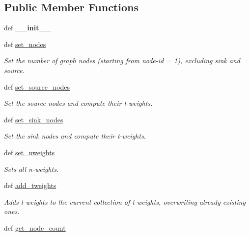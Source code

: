 \subsection*{Public Member Functions}
\begin{DoxyCompactItemize}
\item 
\hypertarget{classmedpy_1_1graphcut_1_1graph_1_1Graph_ada7c2ff7b950159feab5a4d2f69464c9}{
def {\bfseries \_\-\_\-init\_\-\_\-}}
\label{classmedpy_1_1graphcut_1_1graph_1_1Graph_ada7c2ff7b950159feab5a4d2f69464c9}

\item 
def \hyperlink{classmedpy_1_1graphcut_1_1graph_1_1Graph_a41b5d54706b84e5a11523da1ba626848}{set\_\-nodes}
\begin{DoxyCompactList}\small\item\em Set the number of graph nodes (starting from node-\/id = 1), excluding sink and source. \end{DoxyCompactList}\item 
def \hyperlink{classmedpy_1_1graphcut_1_1graph_1_1Graph_af1726ca138ac2522b5fe98f5ae5b157f}{set\_\-source\_\-nodes}
\begin{DoxyCompactList}\small\item\em Set the source nodes and compute their t-\/weights. \end{DoxyCompactList}\item 
def \hyperlink{classmedpy_1_1graphcut_1_1graph_1_1Graph_a54b1a1643e1eedda40c121f9b3e7577d}{set\_\-sink\_\-nodes}
\begin{DoxyCompactList}\small\item\em Set the sink nodes and compute their t-\/weights. \end{DoxyCompactList}\item 
def \hyperlink{classmedpy_1_1graphcut_1_1graph_1_1Graph_a197d5cca5684cebfbabb07f13c4c0175}{set\_\-nweights}
\begin{DoxyCompactList}\small\item\em Sets all n-\/weights. \end{DoxyCompactList}\item 
def \hyperlink{classmedpy_1_1graphcut_1_1graph_1_1Graph_a5a99c76efac37bc31acf495873933122}{add\_\-tweights}
\begin{DoxyCompactList}\small\item\em Adds t-\/weights to the current collection of t-\/weights, overwriting already existing ones. \end{DoxyCompactList}\item 
def \hyperlink{classmedpy_1_1graphcut_1_1graph_1_1Graph_a146e523cb0c30515b5d3a765205461da}{get\_\-node\_\-count}

\end{DoxyCompactItemize}
